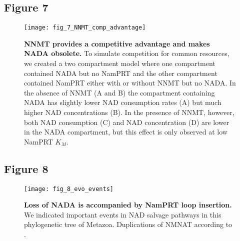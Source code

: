 \newpage


\subsection{Figure 7}

\begin{figure}[ht]
  \centering
  \texttt{[image: fig\_7\_NNMT\_comp\_advantage]}
  \caption{\textbf{NNMT provides a competitive advantage and makes NADA obsolete.} To simulate competition for common resources, we created a two compartment model where one compartment contained NADA but no NamPRT and the other compartment contained NamPRT either with or without NNMT but no NADA. In the absence of NNMT (A and B) the compartment containing NADA has slightly lower NAD consumption rates (A) but much higher NAD concentrations (B). In the presence of NNMT, however, both NAD consumption (C) and NAD concentration (D) are lower in the NADA compartment, but this effect is only observed at low NamPRT $K_M$.}
  \label{fig:NNMT_comp_advantage}
\end{figure}

\newpage


\subsection{Figure 8}

\begin{figure}[ht]
  \centering
  \texttt{[image: fig\_8\_evo\_events]}
  \caption{\textbf{Loss of NADA is accompanied by NamPRT loop insertion.} We indicated important events in NAD salvage pathways in this phylogenetic tree of Metazoa. Duplications of NMNAT according to \cite{Lau2010}. }
  \label{fig:evo_events}
\end{figure}

\newpage
